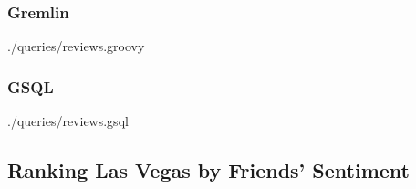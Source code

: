 \subsubsection{Gremlin}




{./queries/reviews.groovy}

\subsubsection{GSQL}



{./queries/reviews.gsql}

\subsection{Ranking Las Vegas by Friends' Sentiment}


